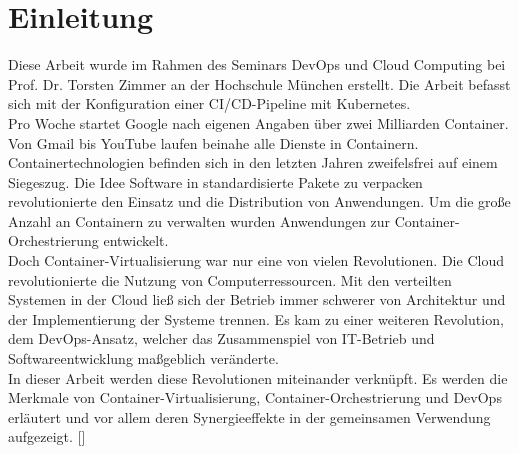 \section{Einleitung}

Diese Arbeit wurde im Rahmen des Seminars DevOps und Cloud Computing bei Prof. Dr. Torsten Zimmer an der Hochschule München erstellt. Die Arbeit befasst sich mit der Konfiguration einer CI/CD-Pipeline mit Kubernetes. \\

Pro Woche startet Google nach eigenen Angaben über zwei Milliarden Container. Von Gmail bis YouTube laufen beinahe alle Dienste in Containern. Containertechnologien befinden sich in den letzten Jahren zweifelsfrei auf einem Siegeszug. Die Idee Software in standardisierte Pakete zu verpacken revolutionierte den Einsatz und die Distribution von Anwendungen. Um die große Anzahl an Containern zu verwalten wurden Anwendungen zur Container-Orchestrierung entwickelt. \\

Doch Container-Virtualisierung war nur eine von vielen Revolutionen. Die Cloud revolutionierte die Nutzung von Computerressourcen. Mit den verteilten Systemen in der Cloud ließ sich der Betrieb immer schwerer von Architektur und der Implementierung der Systeme trennen. Es kam zu einer weiteren Revolution, dem DevOps-Ansatz, welcher das Zusammenspiel von IT-Betrieb und Softwareentwicklung maßgeblich veränderte. \\

In dieser Arbeit werden diese Revolutionen miteinander verknüpft. Es werden die Merkmale von Container-Virtualisierung, Container-Orchestrierung und DevOps erläutert und vor allem deren Synergieeffekte in der gemeinsamen Verwendung aufgezeigt. [\cite[S. 1]{hightowerKubernetesKompakte2018}]
